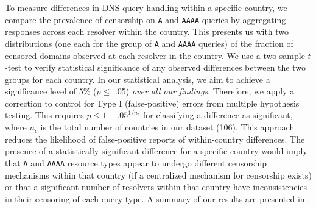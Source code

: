 To measure differences in DNS query handling within a specific country, we
compare the prevalence of censorship on {\tt A} and {\tt AAAA} queries by
aggregating responses across {each resolver within the country}. This presents
us with two distributions (one each for the group of {\tt A} and {\tt AAAA}
queries) of the fraction of censored domains observed at each resolver in the
country.
%
We use a two-sample $t$-test to verify statistical significance of any observed
differences between the two groups for each country. In our statistical
analysis, we aim to achieve a significance level of 5\% ($p \leq$  .05)
\emph{over all our findings}. Therefore, we apply a \Sidak correction
\cite{abdi2007bonferroni} to control for Type I (false-positive) errors from
multiple hypothesis testing. 
%
This requires $p \leq 1-{.05}^{1/n_{c}}$ for classifying a difference as
significant, where $n_c$ is the total number of countries in our dataset
(106). This approach reduces the likelihood of false-positive reports
of within-country differences.
%
The presence of a statistically significant difference for a specific country
would imply that \texttt{A} and \texttt{AAAA} resource types appear to undergo
different censorship mechanisms within that country (if a centralized mechanism
for censorship exists) or that a significant number of resolvers within that
country have inconsistencies in their censoring of each query type.
%
A summary of our results are presented in . 

